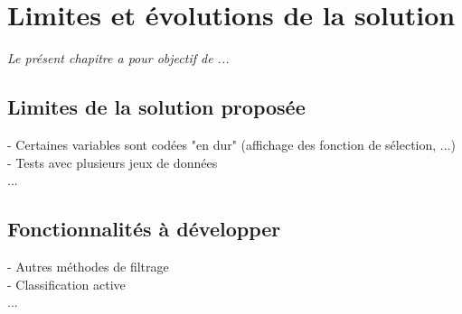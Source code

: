 \chapter[Limites et évolutions de la solution]{Limites et évolutions de la solution}

\textit{Le présent chapitre a pour objectif de ...}

\section{Limites de la solution proposée}

- Certaines variables sont codées "en dur" (affichage des fonction de sélection, ...)\\
- Tests avec plusieurs jeux de données\\
...

\section{Fonctionnalités à développer}

- Autres méthodes de filtrage\\
- Classification active	\\
...
